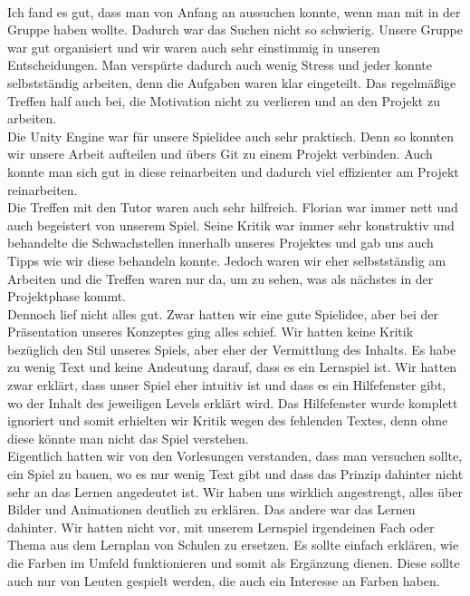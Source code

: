 \documentclass[10pt,a4paper,notitlepage]{report}
\begin{document}
	\\\par\medskip\Text
	Ich fand es gut, dass man von Anfang an aussuchen konnte, wenn man mit in der Gruppe haben wollte. Dadurch war das Suchen nicht so schwierig. Unsere Gruppe war gut organisiert und wir waren auch sehr einstimmig in unseren Entscheidungen. Man verspürte dadurch auch wenig Stress und jeder konnte selbstständig arbeiten, denn die Aufgaben waren klar eingeteilt. Das regelmäßige Treffen half auch bei, die Motivation nicht zu verlieren und an den Projekt zu arbeiten.\\
	Die Unity Engine war für unsere Spielidee auch sehr praktisch. Denn so konnten wir unsere Arbeit aufteilen und übers Git zu einem Projekt verbinden. Auch konnte man sich gut in diese reinarbeiten und dadurch viel effizienter am Projekt reinarbeiten.\\
	Die Treffen mit den Tutor waren auch sehr hilfreich. Florian war immer nett und auch begeistert von unserem Spiel. Seine Kritik war immer sehr konstruktiv und behandelte die Schwachstellen innerhalb unseres Projektes und gab uns auch Tipps wie wir diese behandeln konnte. Jedoch waren wir eher selbstständig am Arbeiten und die Treffen waren nur da, um zu sehen, was als nächstes in der Projektphase kommt.\\
	Dennoch lief nicht alles gut. Zwar hatten wir eine gute Spielidee, aber bei der Präsentation unseres Konzeptes ging alles schief. Wir hatten keine Kritik bezüglich den Stil unseres Spiels, aber eher der Vermittlung des Inhalts. Es habe zu wenig Text und keine Andeutung darauf, dass es ein Lernspiel ist. Wir hatten zwar erklärt, dass unser Spiel eher intuitiv ist und dass es ein Hilfefenster gibt, wo der Inhalt des jeweiligen Levels erklärt wird. Das Hilfefenster wurde komplett ignoriert und somit erhielten wir Kritik wegen des fehlenden Textes, denn ohne diese könnte man nicht das Spiel verstehen.\\
	Eigentlich hatten wir von den Vorlesungen verstanden, dass man versuchen sollte, ein Spiel zu bauen, wo es nur wenig Text gibt und dass das Prinzip dahinter nicht  sehr an das Lernen angedeutet ist. Wir haben uns wirklich angestrengt, alles über Bilder und Animationen deutlich zu erklären. Das andere war das Lernen dahinter. Wir hatten nicht vor, mit unserem Lernspiel irgendeinen Fach oder Thema aus dem Lernplan von Schulen zu ersetzen. Es sollte einfach erklären, wie die Farben im Umfeld funktionieren und somit als Ergänzung dienen. Diese sollte auch nur von Leuten gespielt werden, die auch ein Interesse an Farben haben.\\
	
\end{document}
